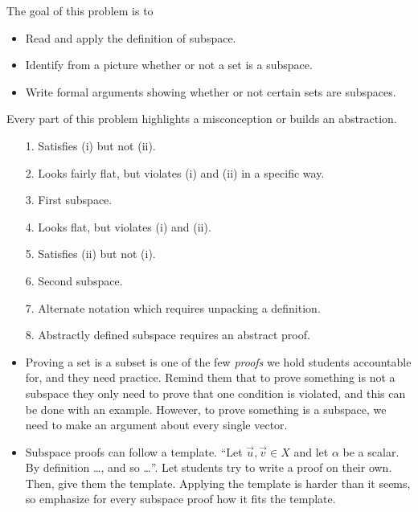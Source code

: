 	\question
	\begin{annotation}
		\begin{goals}

			The goal of this problem is to
			\begin{itemize}
				\item Read and apply the definition of subspace.
				\item Identify from a picture whether or not a set is a subspace.
				\item Write formal arguments showing whether or not certain sets are subspaces.
			\end{itemize}
		\end{goals}

		\begin{notes}
			Every part of this problem highlights a misconception or builds an abstraction.
			\begin{enumerate}
				\item[1.] Satisfies (i) but not (ii).
				\item[2.] Looks fairly flat, but violates (i) and (ii) in a specific way.
				\item[3.] First subspace.
				\item[4.] Looks flat, but violates (i) and (ii).
				\item[5.] Satisfies (ii) but not (i).
				\item[6.] Second subspace.
				\item[7.] Alternate notation which requires unpacking a definition.
				\item[8.] Abstractly defined subspace requires an abstract proof.
			\end{enumerate}
			\begin{itemize}
				\item Proving a set is a subset is one of the few \emph{proofs} we hold
					students accountable for, and they need practice. Remind them
					that to prove something is not a subspace they only need to
					prove that one condition is violated, and this can be done with
					an example. However, to prove something is a subspace, we need
					to make an argument about every single vector.
				\item Subspace proofs can follow a template. ``Let $\vec u,\vec v\in X$ and
					let $\alpha$ be a scalar. By definition \ldots, and so \ldots''. Let
					students try to write a proof on their own. Then, give them
					the template. Applying the template is harder than it seems, so
					emphasize for every subspace proof how it fits the template.
			\end{itemize}
		\end{notes}
	\end{annotation}
